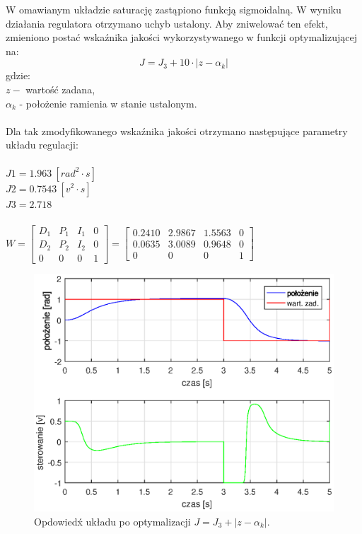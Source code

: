 W omawianym układzie saturację zastąpiono funkcją sigmoidalną. W wyniku działania regulatora otrzymano uchyb ustalony. Aby zniwelować ten efekt, zmieniono postać wska\'znika jakości wykorzystywanego w funkcji optymalizującej na:
\begin{equation}\label{key}
J = J_3 + 10 \cdot |z - \alpha_k|
\end{equation}
gdzie:\\
$z - $ wartość zadana,\\
$\alpha_k$ - położenie ramienia w stanie ustalonym.\\\\
Dla tak zmodyfikowanego wska\'znika jakości otrzymano następujące parametry układu regulacji:\\
\\
$J1 = 1.963 \ [rad^2 \cdot s]$\\
$J2 = 0.7543 \ [v^2 \cdot s] $\\
$J3 = 2.718$ \\
\\
$W = \begin{bmatrix}
	D_1& P_1& I_1&0\\
	D_2& P_2& I_2&0\\
	0&0&0&1
	\end{bmatrix} = 
	 \begin{bmatrix}
	 	0.2410&2.9867& 1.5563&0\\
	0.0635& 3.0089&0.9648&0\\
	0&0&0&1
	\end{bmatrix} 
$

\begin{figure}[h!]
	\centering
	\includegraphics[scale = 1]{fig/neural_opt_uchyb.eps}
	\caption		
	{Opdowied\'x układu po optymalizacji $J = J_3 + |z - \alpha_k|$.}
	\label{neuron_ster_opt_uchyb}
\end{figure}

